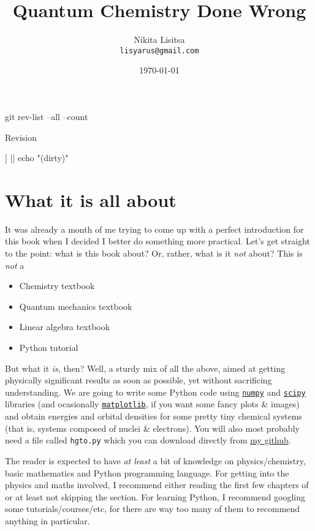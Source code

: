 \documentclass{article}
\newcommand{\githubrepo}{https://github.com/lisyarus/chembook}
\begin{document}
\title{Quantum Chemistry Done Wrong}
\author{Nikita Lisitsa \\ \texttt{lisyarus@gmail.com}}
\date{\today}

\maketitle

\bash
git rev-list --all --count
\END
\centerline{Revision \bashStdout}

\bash
[[ "$(git diff --stat)" == "" ]] || echo "(dirty)"
\END
\centerline{\bashStdout}

\newpage

\tableofcontents

\newpage

\section{What it is all about}

It was already a month of me trying to come up with a perfect introduction for this book when I decided I better do something more practical. Let's get straight to the point: what is this book about? Or, rather, what is it \textit{not} about? This is \textit{not} a

\begin{itemize}
\item Chemistry textbook
\item Quantum mechanics textbook
\item Linear algebra textbook
\item Python tutorial
\end{itemize}

But what it \textit{is}, then? Well, a sturdy mix of all the above, aimed at getting physically significant results as soon as possible, yet without sacrificing understanding. We are going to write some Python code using \href{https://numpy.org}{\texttt{numpy}} and \href{https://www.scipy.org}{\texttt{scipy}} libraries (and ocasionally \href{https://matplotlib.org}{\texttt{matplotlib}}, if you want some fancy plots \& images) and obtain energies and orbital densities for some pretty tiny chemical systems (that is, systems composed of nuclei \& electrons). You will also most probably need a file called \texttt{hgto.py} which you can download directly from \href{\githubrepo/blob/master/code/hgto.py}{my github}.

The reader is expected to have \textit{at least} a bit of knowledge on physics/chemistry, basic mathematics and Python programming language. For getting into the physics and maths involved, I recommend either reading the first few chapters of \cite{ref:atkins} or at least not skipping the  section. For learning Python, I recommend googling some tutorials/courses/etc, for there are way too many of them to recommend anything in particular.
\end{document}
